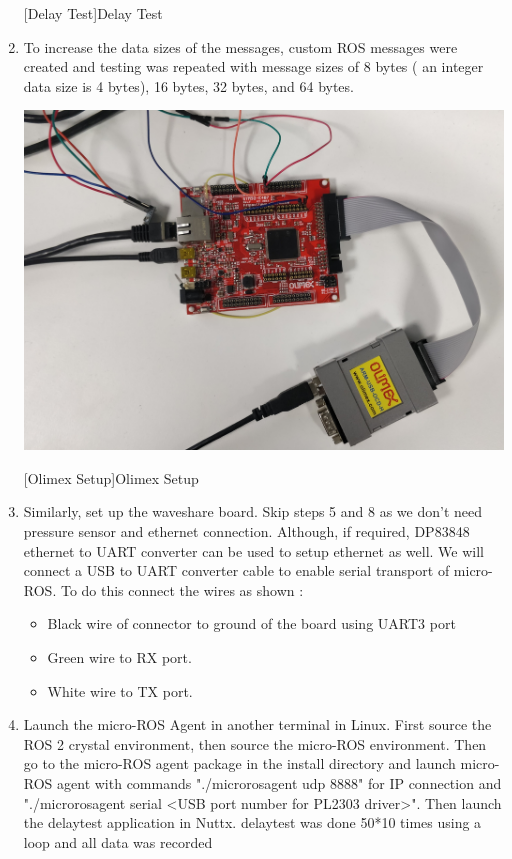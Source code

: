 \documentclass[%
xelatex,
	oneside,		%
	12pt,			%
	parskip=half,	%
	abstracton,
	chapterprefix=true%
    appendixprefix=true]
{scrbook}
\begin{document}
\begin{enumerate}
\begin{center}
[Delay Test]{Delay Test}
\label{fig:delay}
\end{center}
\item To increase the data sizes of the messages, custom ROS messages were created and testing was repeated with message sizes of 8 bytes ( an integer data size is 4 bytes), 16 bytes, 32 bytes, and 64 bytes.
\begin{center}
\includegraphics[scale=0.1]{fig/olimex.jpg}

[Olimex Setup]{Olimex Setup}
\label{fig:olimexsetup}
\end{center}
\item Similarly, set up the waveshare board. Skip steps 5 and 8 as we don't need pressure sensor and ethernet connection. Although, if required, DP83848 ethernet to UART converter can be used to setup ethernet as well. We will connect a USB to UART converter cable to enable serial transport of micro-ROS. To do this connect the wires as shown : 
\begin{itemize}
\item Black wire of connector to ground of the board using UART3 port
\item Green wire to RX port.
\item White wire to TX port.
\end{itemize}
\item Launch the micro-ROS Agent in another terminal in Linux. First source the ROS 2 crystal environment, then source the micro-ROS environment. Then go to the micro-ROS agent package in the install directory and launch micro-ROS agent with commands "./micro\textunderscore ros\textunderscore agent udp 8888" for IP connection and "./micro\textunderscore ros\textunderscore agent serial <USB port number for PL2303 driver>". Then launch the delay\textunderscore test application in Nuttx. delay\textunderscore test was done 50*10 times using a loop and all data was recorded
\end{enumerate}
\end{document}
